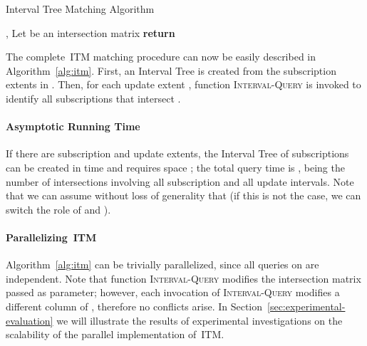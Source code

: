 \documentclass[10pt, conference, compsocconf]{IEEEtran}
\begin{document}
\begin{algorithm}[t]
\caption{Interval Tree Matching Algorithm}\label{alg:itm}
\begin{algorithmic}
\State , 
\State Let  be an  intersection matrix
\State 
\ForAll{}
\State {}
\EndFor
\State \textbf{return} 
\EndFunction
\end{algorithmic}
\end{algorithm}

The complete~\ac{ITM} matching procedure can now be easily described
in Algorithm~\ref{alg:itm}. First, an Interval Tree  is created
from the subscription extents in .  Then, for each update
extent , function \textsc{Interval-Query} is
invoked to identify all subscriptions that intersect .

\paragraph*{Asymptotic Running Time} If there are
 subscription and  update extents, the Interval Tree of
subscriptions can be created in time  and requires space
; the total query time is ,  being the number of intersections involving
all subscription and all update intervals. Note that we can assume
without loss of generality that  (if this is not the case,
we can switch the role of  and ).

\paragraph*{Parallelizing~\ac{ITM}}
Algorithm~\ref{alg:itm} can be trivially parallelized, since all 
queries on  are independent. Note that function
\textsc{Interval-Query} modifies the intersection matrix 
passed as parameter; however, each invocation of
\textsc{Interval-Query} modifies a different column of ,
therefore no conflicts arise.  In
Section~\ref{sec:experimental-evaluation} we will illustrate the
results of experimental investigations on the scalability of the
parallel implementation of~\ac{ITM}.
\end{document}
